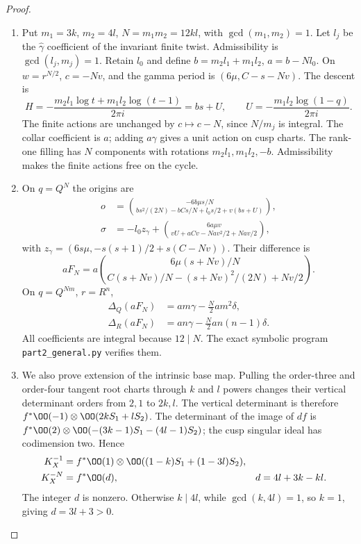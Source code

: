 \begin{proof}
\begin{enumerate}[label=\arabic*.,leftmargin=*]
\item Put $m_1=3k$, $m_2=4l$, $N=m_1m_2=12kl$, with $\gcd(m_1,m_2)=1$. Let $l_j$ be the $\widehat\gamma$ coefficient of the invariant finite twist. Admissibility is $\gcd(l_j,m_j)=1$. Retain $l_0$ and define $b=m_2l_1+m_1l_2$, $a=b-Nl_0$. On $w=r^{N/2}$, $c=-Nv$, and the gamma period is $(6\mu,C-s-Nv)$. The descent is
\[
 H=-\frac{m_2l_1\log t+m_1l_2\log(t-1)}{2\pi i}=bs+U,
 \qquad U=-\frac{m_1l_2\log(1-q)}{2\pi i}.
\]
The finite actions are unchanged by $c\mapsto c-N$, since $N/m_j$ is integral. The collar coefficient is $a$; adding $a\gamma$ gives a unit action on cusp charts. The rank-one filling has $N$ components with rotations $m_2l_1,m_1l_2,-b$. Admissibility makes the finite actions free on the cycle.

\item On $q=Q^N$ the origins are
\begin{align*}
 o&=\binom{-6b\mu s/N}{bs^2/(2N)-bCs/N+l_0s/2+v(bs+U)},\\
 \sigma&=-l_0z_\gamma+\binom{6a\mu v}{vU+aCv-Nav^2/2+Nav/2},
\end{align*}
with $z_\gamma=(6s\mu,-s(s+1)/2+s(C-Nv))$. Their difference is
\[
 aF_N=a\binom{6\mu(s+Nv)/N}{C(s+Nv)/N-(s+Nv)^2/(2N)+Nv/2}.
\]
On $q=Q^{Nm}$, $r=R^n$,
\begin{align*}
 \Delta_Q(aF_N)&=am\gamma-\tfrac N2am^2\delta,\\
 \Delta_R(aF_N)&=an\gamma-\tfrac N2an(n-1)\delta.
\end{align*}
All coefficients are integral because $12\mid N$. The exact symbolic program \texttt{part2\_general.py} verifies them.

\item We also prove extension of the intrinsic base map. Pulling the order-three and order-four tangent root charts through $k$ and $l$ powers changes their vertical determinant orders from $2,1$ to $2k,l$. The vertical determinant is therefore $f^*\OO(-1)\otimes\OO(2kS_1+lS_2)$. The determinant of the image of $df$ is $f^*\OO(2)\otimes\OO(-(3k-1)S_1-(4l-1)S_2)$; the cusp singular ideal has codimension two. Hence
\begin{align*}
 K_X^{-1}&=f^*\OO(1)\otimes\OO((1-k)S_1+(1-3l)S_2),\\
 K_X^{-N}&=f^*\OO(d),& d&=4l+3k-kl.
\end{align*}
The integer $d$ is nonzero. Otherwise $k\mid4l$, while $\gcd(k,4l)=1$, so $k=1$, giving $d=3l+3>0$.


\end{enumerate}
\end{proof}
